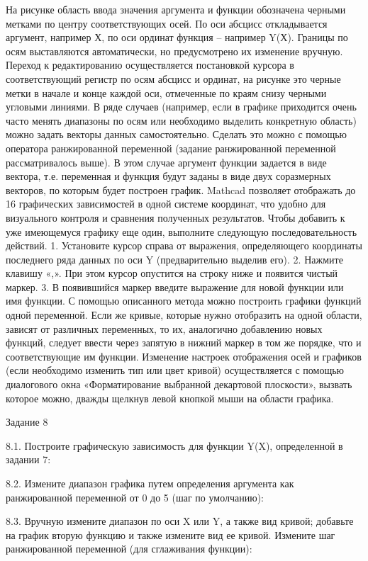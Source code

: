На рисунке область ввода значения аргумента и функции обозначена черными метками по центру соответствующих осей. По оси абсцисс откладывается аргумент, например Х, по оси ординат функция – например Y(Х). Границы по осям выставляются автоматически, но предусмотрено их изменение вручную. Переход к редактированию осуществляется постановкой курсора в соответствующий регистр по осям абсцисс и ординат, на рисунке это черные метки в начале и конце каждой оси, отмеченные по краям снизу черными угловыми линиями. 
В ряде случаев (например, если в графике приходится очень часто менять диапазоны по осям или необходимо выделить конкретную область) можно задать векторы данных самостоятельно. Сделать это можно с помощью оператора ранжированной переменной (задание ранжированной переменной рассматривалось выше). В этом случае аргумент функции задается в виде вектора, т.е. переменная и функция будут заданы в виде двух соразмерных векторов, по которым будет построен график.
Mathcad позволяет отображать до 16 графических зависимостей в одной системе координат, что удобно для визуального контроля и сравнения полученных результатов. Чтобы добавить к уже имеющемуся графику еще один, выполните следующую последовательность действий.
1. Установите курсор справа от выражения, определяющего координаты последнего ряда данных по оси Y (предварительно выделив его).
2. Нажмите клавишу «,». При этом курсор опустится на строку ниже и появится чистый маркер.
3. В появившийся маркер введите выражение для новой функции или имя функции.
С помощью описанного метода можно построить графики функций одной переменной. Если же кривые, которые нужно отобразить на одной области, зависят от различных переменных, то их, аналогично добавлению новых функций, следует ввести через запятую в нижний маркер в том же порядке, что и соответствующие им функции.
Изменение настроек отображения осей и графиков (если необходимо изменить тип или цвет кривой) осуществляется с помощью диалогового окна «Форматирование выбранной декартовой плоскости», вызвать которое можно, дважды щелкнув левой кнопкой мыши на области графика.

Задание 8

8.1. Построите графическую зависимость для функции Y(X), определенной в задании 7:



8.2. Измените диапазон графика путем определения аргумента как ранжированной переменной от 0 до 5 (шаг по умолчанию):



8.3. Вручную измените диапазон по оси X или Y, а также вид кривой; добавьте на график вторую функцию и также измените вид ее кривой. Измените шаг ранжированной переменной (для сглаживания функции):




